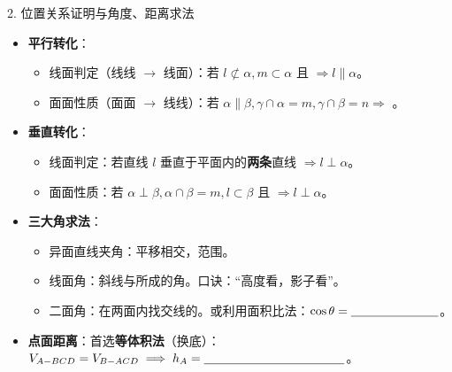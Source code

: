 \documentclass[11pt,a4paper]{ctexart}
\begin{document}
\begin{taskbox}{2. 位置关系证明与角度、距离求法}
\begin{itemize}[leftmargin=1.5em, itemsep=0.8em]
  \item \textbf{平行转化}：
  \begin{itemize}[leftmargin=1.5em, itemsep=0.3em]
    \item 线面判定（线线 $\rightarrow$ 线面）：若 $l \not\subset \alpha, m \subset \alpha$ 且 \blank{2.0cm} $\Rightarrow l \parallel \alpha$。
    \item 面面性质（面面 $\rightarrow$ 线线）：若 $\alpha \parallel \beta, \gamma \cap \alpha = m, \gamma \cap \beta = n \Rightarrow$ \blank{2.0cm}。
  \end{itemize}
  \item \textbf{垂直转化}：
  \begin{itemize}[leftmargin=1.5em, itemsep=0.3em]
    \item 线面判定：若直线 $l$ 垂直于平面内的\textbf{两条}\blank{2.0cm}直线 $\Rightarrow l \perp \alpha$。
    \item 面面性质：若 $\alpha \perp \beta, \alpha \cap \beta = m, l \subset \beta$ 且 \blank{2.0cm} $\Rightarrow l \perp \alpha$。
  \end{itemize}
  \item \textbf{三大角求法}：
  \begin{itemize}[leftmargin=1.5em, itemsep=0.3em]
    \item 异面直线夹角：平移相交，范围\blank{2.0cm}。
    \item 线面角：斜线与\blank{2.5cm}所成的角。口诀：“高度看\blank{1.5cm}，影子看\blank{1.5cm}”。
    \item 二面角：在两面内找交线的\blank{2.5cm}。或利用面积比法：$\cos\theta = \blank{2.5cm}$。
  \end{itemize}
  \item \textbf{点面距离}：首选\textbf{等体积法}（换底）：$V_{A-BCD} = V_{B-ACD} \implies h_A = \blank{4.0cm}$。
\end{itemize}
\end{taskbox}
\end{document}
